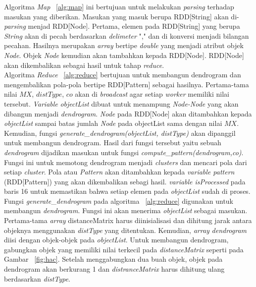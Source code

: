 Algoritma \textit{Map} ~\ref{alg:map} ini bertujuan untuk melakukan \textit{parsing} terhadap masukan yang diberikan. Masukan yang masuk berupa RDD[String] akan di-\textit{parsing} menjad RDD[Node]. Pertama, elemen pada RDD[String] yang berupa \textit{String} akan di pecah berdasarkan \textit{delimeter} "," dan di konversi menjadi bilangan pecahan. Hasilnya merupakan \textit{array} bertipe \textit{double} yang menjadi atribut objek \textit{Node}. Objek \textit{Node} kemudian akan tambahkan kepada RDD[Node]. RDD[Node] akan dikembalikan sebagai hasil untuk tahap \textit{reduce}.\\

Algoritma \textit{Reduce} ~\ref{alg:reduce} bertujuan untuk membangun dendrogram dan mengembalikan pola-pola bertipe RDD[Pattern] sebagai hasilnya. Pertama-tama nilai $MX$, $distType$, $co$ akan di \textit{broadcast} agar setiap \textit{worker} memiliki nilai tersebut. \textit{Variable} \textit{objectList} dibuat untuk menampung \textit{Node-Node} yang akan dibangun menjadi \textit{dendrogram}. \textit{Node} pada RDD[Node] akan ditambahkan kepada \textit{objectList} sampai batas jumlah \textit{Node} pada objectList sama dengan nilai $MX$. Kemudian, fungsi \textit{generate\_dendrogram(objectList, distType)} akan dipanggil untuk membangun dendrogram. Hasil dari fungsi tersebut yaitu sebuah \textit{dendrogram} dijadikan masukan untuk fungsi \textit{compute\_pattern(dendrogram,co)}. Fungsi ini untuk memotong dendrogram menjadi \textit{clusters} dan mencari pola dari setiap \textit{cluster}. Pola atau \textit{Pattern} akan ditambahkan kepada \textit{variable pattern} (RDD[Pattern]) yang akan dikembalikan sebagi hasil. \textit{variable isProcessed} pada baris 16 untuk memastikan bahwa setiap elemen pada \textit{objectList} sudah di proses. \\


Fungsi \textit{generate}\_\textit{dendrogram} pada algoritma ~\ref{alg:reduce} digunakan untuk membangun \textit{dendrogram}. Fungsi ini akan menerima \textit{objectList} sebagai masukan. Pertama-tama \textit{array} distanceMatrix harus diinisialisasi dan dihitung jarak antara objeknya menggunakan \textit{distType} yang ditentukan. Kemudian, \textit{array} \textit{dendrogram} diisi dengan objek-objek pada \textit{objectList}. Untuk membangun dendrogram, gabungkan objek yang memiliki nilai terkecil pada \textit{distanceMatrix} seperti pada Gambar ~\ref{fig:hac}. Setelah menggabungkan dua buah objek, objek pada dendrogram akan berkurang 1 dan \textit{distranceMatrix} harus dihitung ulang berdasarkan \textit{distType}.

